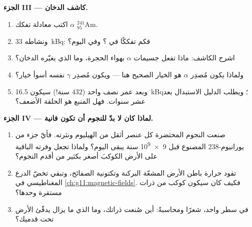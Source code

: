 \begin{problem}
\medskip
\noindent\textbf{الجزء III --- كاشف الدخان.}
\begin{enumerate}[resume]
  \item اكتب معادلة تفكك $\alpha$  ${}^{241}_{95}\mathrm{Am}$.
  \item ونشاطه \qty{33}{kBq}: فكم تفككًا في ؟ وفي اليوم؟
  \item اشرح الكاشف: ماذا تفعل جسيمات $\alpha$ بهواء
        الحجرة، وما الذي يغيّره الدخان؟
  \item ولماذا يكون مُصدِر $\alpha$ هو الخيار الصحيح هنا --- ويكون
        مُصدِر $\gamma$  نفسه أسوأ خيار؟
  \item وبعد عمر نصف واحد ($432$ سنة!) سيكون 
        \qty{16.5}{kBq}؛ ويطلب الدليل الاستبدال بعد عشر سنوات.
        فهل المنبع هو الحلقة الأضعف؟
\end{enumerate}

\medskip
\noindent\textbf{الجزء IV --- لماذا كان لا بدّ للنجوم أن تكون فانية.}
\begin{enumerate}[resume]
  \item صنعت النجوم المحتضرة كل عنصر أثقل من الهيليوم ونثرته.
        فأيّ جزء من يورانيوم-238 المصنوع قبل \num{9e9} سنة
        يبقى اليوم؟ ولماذا تجعل وفرته الباقية على الأرض
        الكوكبَ أصغر بكثير من أقدم النجوم؟
  \item تقود حرارة باطن الأرض المشعّة البركنة وتكتونية
        الصفائح، وتبقي  تخضّ الدرع المغناطيسي في
        \cref{ch:g11:magnetic-fields}. فكيف كان سيكون كوكب من ذرات
        مستقرة وحدها؟
  \item في سطر واحد، شعرًا ومحاسبةً: أين صُنعت ذراتك،
        وما الذي ما يزال يدفّئ الأرض تحت قدميك؟
\end{enumerate}
\end{problem}
